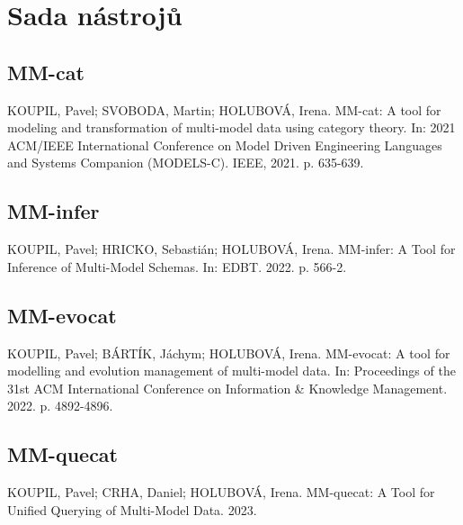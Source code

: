 
\chapter{Sada nástrojů}


\section{MM-cat}

KOUPIL, Pavel; SVOBODA, Martin; HOLUBOVÁ, Irena. MM-cat: A tool for modeling and transformation of multi-model data using category theory. In: 2021 ACM/IEEE International Conference on Model Driven Engineering Languages and Systems Companion (MODELS-C). IEEE, 2021. p. 635-639.


\section{MM-infer}

KOUPIL, Pavel; HRICKO, Sebastián; HOLUBOVÁ, Irena. MM-infer: A Tool for Inference of Multi-Model Schemas. In: EDBT. 2022. p. 566-2.


\section{MM-evocat}

KOUPIL, Pavel; BÁRTÍK, Jáchym; HOLUBOVÁ, Irena. MM-evocat: A tool for modelling and evolution management of multi-model data. In: Proceedings of the 31st ACM International Conference on Information \& Knowledge Management. 2022. p. 4892-4896.


\section{MM-quecat}

KOUPIL, Pavel; CRHA, Daniel; HOLUBOVÁ, Irena. MM-quecat: A Tool for Unified Querying of Multi-Model Data. 2023.
